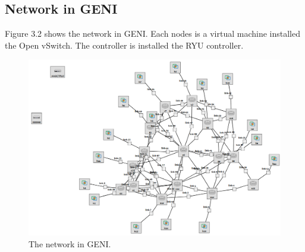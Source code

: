 \documentclass[a4paper,12pt]{report}
\begin{document}
\begin{CJK*}{UTF8}{bkai}
\begin{large}
	    \section{Network in GENI}
	      \qquad Figure 3.2 shows the network in GENI. Each nodes is a virtual machine installed the Open vSwitch. The controller is installed the RYU controller.
	    \begin{figure}
	          \caption{The network in GENI.}
	          \centering
	          \includegraphics[width=1.0\textwidth]{GENI_network.png}
	       \end{figure}

\end{large}
\end{CJK*}
\end{document}
